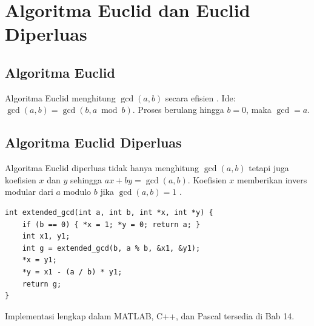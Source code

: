 \section{Algoritma Euclid dan Euclid Diperluas}

\subsection{Algoritma Euclid}
Algoritma Euclid menghitung $\gcd(a, b)$ secara efisien \cite{stinson2018,menezes1996}. Ide: $\gcd(a, b) = \gcd(b, a \bmod b)$. Proses berulang hingga $b = 0$, maka $\gcd = a$.

\subsection{Algoritma Euclid Diperluas}
Algoritma Euclid diperluas tidak hanya menghitung $\gcd(a, b)$ tetapi juga koefisien $x$ dan $y$ sehingga $ax + by = \gcd(a, b)$. Koefisien $x$ memberikan invers modular dari $a$ modulo $b$ jika $\gcd(a, b) = 1$ \cite{stinson2018,menezes1996}.

\begin{lstlisting}[style=cstyle,caption={Algoritma Euclid Diperluas dalam C}]
int extended_gcd(int a, int b, int *x, int *y) {
    if (b == 0) { *x = 1; *y = 0; return a; }
    int x1, y1;
    int g = extended_gcd(b, a % b, &x1, &y1);
    *x = y1;
    *y = x1 - (a / b) * y1;
    return g;
}
\end{lstlisting}

Implementasi lengkap dalam MATLAB, C++, dan Pascal tersedia di Bab 14.

